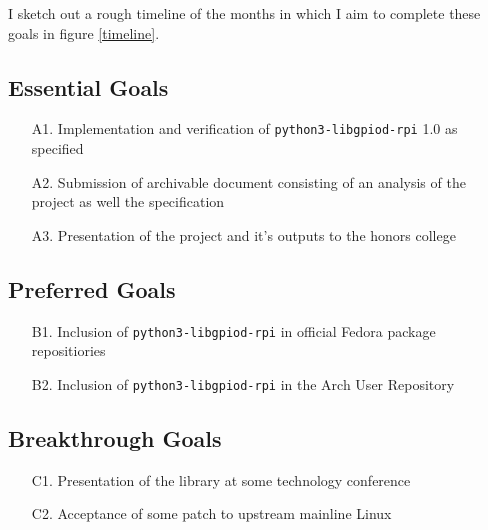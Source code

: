 \documentclass[12pt]{article}
\begin{document}
I sketch out a rough timeline
of the months
in which I aim to complete these goals
in figure \ref{timeline}.

\subsection{Essential Goals}

\begin{enumerate}

	\item[A1.]  Implementation and verification of \texttt{python3-libgpiod-rpi} 1.0 as specified
	\item[A2.] Submission of archivable document consisting of an analysis of the project as well the specification
	\item[A3.] Presentation of the project and it's outputs to the honors college

\end{enumerate}

\subsection{Preferred Goals}

\begin{enumerate}
	\item[B1.] Inclusion of \texttt{python3-libgpiod-rpi} in official Fedora package repositiories
	\item[B2.] Inclusion of \texttt{python3-libgpiod-rpi} in the Arch User Repository
\end{enumerate}

\subsection{Breakthrough Goals}

\begin{enumerate}
	\item[C1.]  Presentation of the library at some technology conference
	\item[C2.]  Acceptance of some patch to upstream mainline Linux
\end{enumerate}
\end{document}
